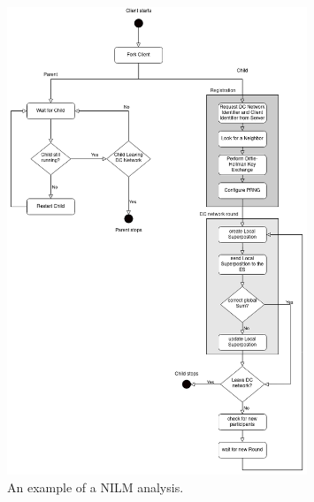 \begin{figure}[tbp]
  \centering
  \includegraphics[width=0.8\textwidth]{images/Client_structure.png}
  \caption[Short description]{An example of a NILM analysis.}
  \label{fig:Appliance_Model}
\end{figure}


